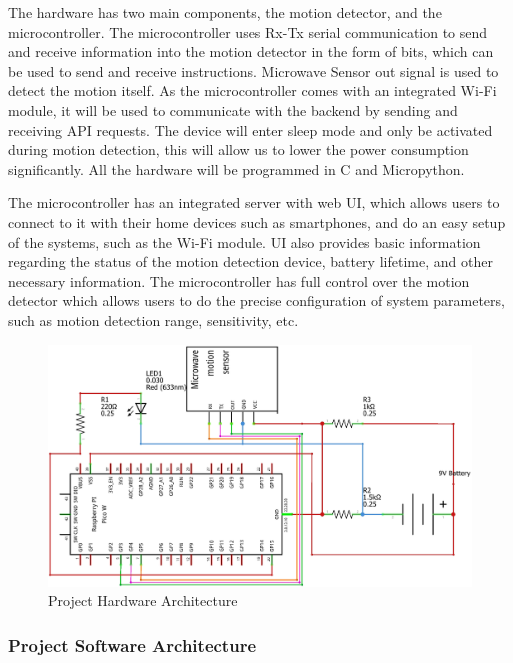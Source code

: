 \documentclass[conference]{IEEEtran}
\begin{document}
The hardware has two main components, the motion detector, and the microcontroller.
The microcontroller uses Rx-Tx serial communication to send and receive information
into the motion detector in the form of bits, which can be used to send and receive
instructions. Microwave Sensor out signal is used to detect the motion itself.
As the microcontroller comes with an integrated Wi-Fi module, it will be used to
communicate with the backend by sending and receiving API requests.
The device will enter sleep mode and only be activated during motion detection,
this will allow us to lower the power consumption significantly.
All the hardware will be programmed in C and Micropython.

The microcontroller has an integrated server with web UI, which allows users
to connect to it with their home devices such as smartphones, and do an easy setup
of the systems, such as the Wi-Fi module. UI also provides basic information regarding
the status of the motion detection device, battery lifetime, and other necessary
information. The microcontroller has full control over the motion detector which
allows users to do the precise configuration of system parameters, such as motion
detection range, sensitivity, etc.

\begin{figure}[htbp]
      \centering
      \includegraphics[width=1.5\linewidth, angle=-90]{hardwareArchitecture.jpg}
      \caption{Project Hardware Architecture}
      \label{fig:hardwareArchitecture}
\end{figure}

\subsubsection{Project Software Architecture}
\end{document}
